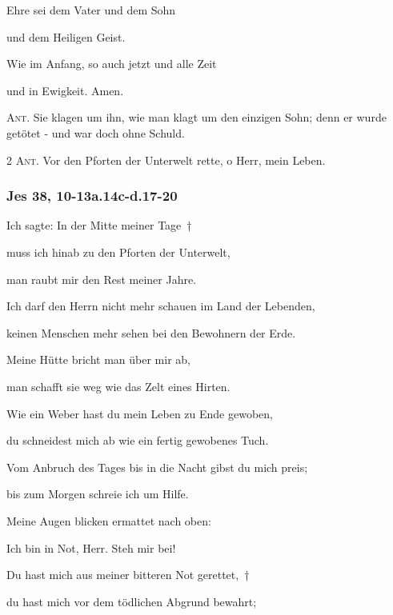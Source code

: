 \noindent Ehre sei dem Vater und dem Sohn~\GreStar{}~\nopagebreak

und dem Heiligen Geist.

\noindent Wie im Anfang, so auch jetzt und alle Zeit~\GreStar{}~\nopagebreak

und in Ewigkeit. Amen.

\vspace{10pt}

\noindent \textsc{Ant.} Sie klagen um ihn, wie man klagt um den einzigen Sohn; denn er wurde getötet - und war doch ohne Schuld.


\newpage

\noindent \textsc{2 Ant.} Vor den Pforten der Unterwelt rette, o Herr, mein Leben.

\subsubsection{Jes 38, 10-13a.14c-d.17-20}

\noindent Ich sagte: In der Mitte meiner Tage~†~\nopagebreak

muss ich hinab zu den Pforten der Unterwelt,~\GreStar{}~\nopagebreak

man raubt mir den Rest meiner Jahre.

\noindent Ich darf den Herrn nicht mehr schauen im Land der Lebenden,~\GreStar{}~\nopagebreak

keinen Menschen mehr sehen bei den Bewohnern der Erde.

\noindent Meine Hütte bricht man über mir ab,~\GreStar{}~\nopagebreak

man schafft sie weg wie das Zelt eines Hirten. 

\noindent Wie ein Weber hast du mein Leben zu Ende gewoben,~\GreStar{}~\nopagebreak

du schneidest mich ab wie ein fertig gewobenes Tuch. 

\noindent Vom Anbruch des Tages bis in die Nacht gibst du mich preis;~\GreStar{}~\nopagebreak

bis zum Morgen schreie ich um Hilfe.

\noindent Meine Augen blicken ermattet nach oben:~\GreStar{}~\nopagebreak

Ich bin in Not, Herr. Steh mir bei!

\noindent Du hast mich aus meiner bitteren Not gerettet,~†~\nopagebreak

du hast mich vor dem tödlichen Abgrund bewahrt;~\GreStar{}~\nopagebreak

